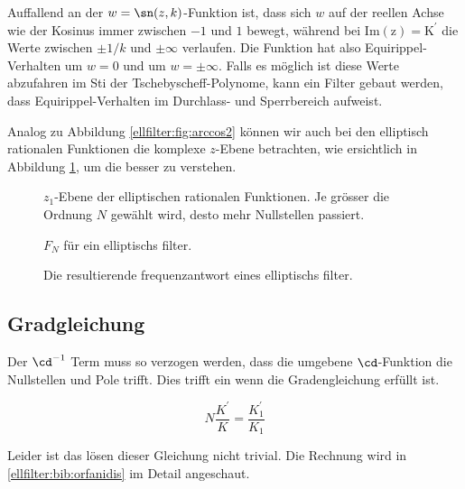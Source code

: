 Auffallend an der $w = \sn(z, k)$-Funktion ist, dass sich $w$ auf der reellen Achse wie der Kosinus immer zwischen $-1$ und $1$ bewegt, während bei $\mathrm{Im(z) = K^\prime}$ die Werte zwischen $\pm 1/k$ und $\pm \infty$ verlaufen.
Die Funktion hat also Equirippel-Verhalten um $w=0$ und um $w=\pm \infty$.
Falls es möglich ist diese Werte abzufahren im Sti der Tschebyscheff-Polynome, kann ein Filter gebaut werden, dass Equirippel-Verhalten im Durchlass- und Sperrbereich aufweist.



Analog zu Abbildung \ref{ellfilter:fig:arccos2} können wir auch bei den elliptisch rationalen Funktionen die komplexe $z$-Ebene betrachten, wie ersichtlich in Abbildung \ref{ellfilter:fig:cd2}, um die besser zu verstehen.
\begin{figure}
    \centering
    
    \caption{
        $z_1$-Ebene der elliptischen rationalen Funktionen.
        Je grösser die Ordnung $N$ gewählt wird, desto mehr Nullstellen passiert.
    }
    \label{ellfilter:fig:cd2}
\end{figure}



\begin{figure}
    \centering
    
    \caption{$F_N$ für ein elliptischs filter.}
    \label{ellfilter:fig:elliptic}
\end{figure}


\begin{figure}
    \centering
    
    \caption{Die resultierende frequenzantwort eines elliptischs filter.}
    \label{ellfilter:fig:elliptic_freq}
\end{figure}

\subsection{Gradgleichung}

Der $\cd^{-1}$ Term muss so verzogen werden, dass die umgebene $\cd$-Funktion die Nullstellen und Pole trifft.
Dies trifft ein wenn die Gradengleichung erfüllt ist.

\begin{equation}
    N \frac{K^\prime}{K} = \frac{K^\prime_1}{K_1}
\end{equation}


Leider ist das lösen dieser Gleichung nicht trivial.
Die Rechnung wird in \ref{ellfilter:bib:orfanidis} im Detail angeschaut.


